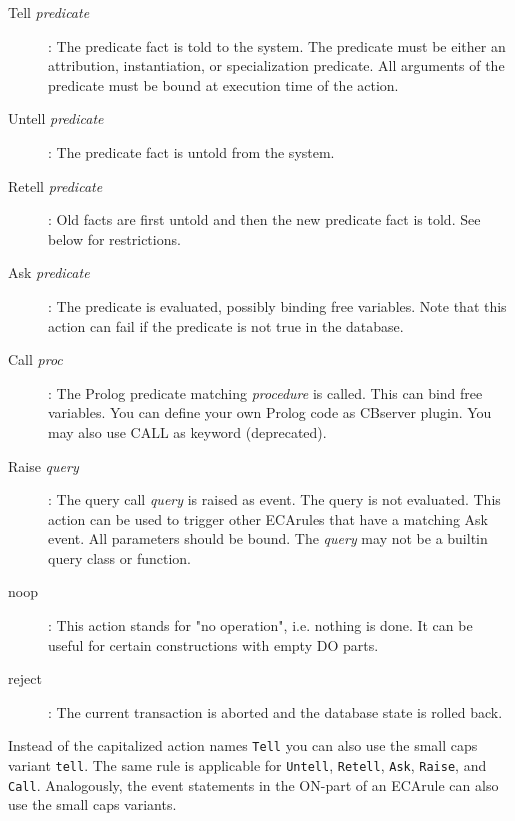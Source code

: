 \begin{description}

\item[Tell {\em predicate\/}] : The predicate fact is told to the system. The predicate must be
either an attribution, instantiation, or specialization predicate. All arguments of
the predicate must be bound at execution time of the action.

\item[Untell {\em predicate\/}]: The predicate fact is untold from the system. 

\item[Retell {\em predicate\/}]: Old facts are first untold and then the new predicate
fact is told. See below for restrictions.

\item[Ask {\em predicate\/}]: The predicate is evaluated, possibly binding free variables.
Note that this action can fail if the predicate is not true in the database.

\item[Call {\em proc\/}]: The Prolog predicate matching {\em procedure\/} is called. This
can bind free variables. You can define your own Prolog code as CBserver plugin. 
You may also use CALL as keyword (deprecated).

\item[Raise {\em query\/}]: The query call {\em query\/} is raised as event. The query is not evaluated.
This action can be used to trigger other ECArules that have a matching Ask event.
All parameters should be bound. The {\em query\/} may not be a builtin query class or function.

\item[noop]: This action stands for "no operation", i.e. nothing is done. It can be useful for
certain constructions with empty DO parts.

\item[reject]: The current transaction is aborted and the database state is rolled back. 

\end{description}

Instead of the capitalized action names {\tt Tell} you can also use the small caps variant
{\tt tell}. The same rule is applicable for {\tt Untell}, {\tt Retell}, {\tt Ask}, {\tt Raise},
and {\tt Call}. Analogously, the event statements in the ON-part of an ECArule can also use the
small caps variants.

